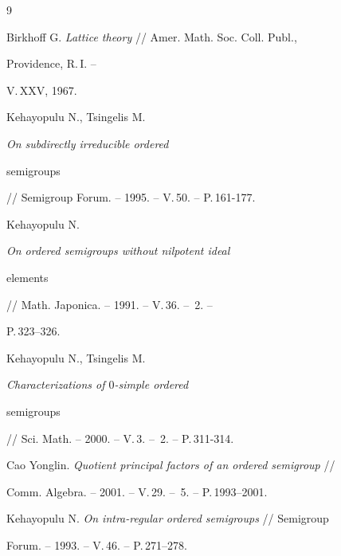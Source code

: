 \begin{thebibliography}{9} 


 




Birkhoff G. {\em Lattice theory} // Amer. Math. Soc. Coll. Publ.,


Providence, R.\,I. --


V.\,XXV, 1967. 




Kehayopulu N., Tsingelis M. {\em On subdirectly irreducible ordered 


semigroups} // Semigroup Forum. -- 1995. -- V.\,50. -- P.\,161-177. 




Kehayopulu N. {\em On ordered semigroups without nilpotent ideal 


elements} // Math. Japonica. -- 1991. -- V.\,36. -- \No\,2. -- 


P.\,323--326. 




Kehayopulu N., Tsingelis M. {\em Characterizations of $0$-simple ordered 


semigroups} // Sci. Math. -- 2000. -- V.\,3. -- \No\,2. -- P.\,311-314. 




Cao Yonglin. {\em Quotient principal factors of an ordered semigroup} // 


Comm. Algebra. -- 2001. -- V.\,29. -- \No\,5. -- P.\,1993--2001.




Kehayopulu N. {\em On intra-regular ordered semigroups} // Semigroup 


Forum. -- 1993. -- V.\,46. -- P.\,271--278. 


 


\end{thebibliography} 


 


\vskip 0.5cm 


 






 


\label{end} 


 





